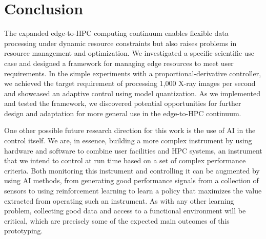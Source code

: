 \section{Conclusion}
\label{ch6:sec:conclusion}

The expanded edge-to-HPC computing continuum enables flexible data processing under dynamic resource constraints but also raises  problems in resource management and optimization. We investigated a specific scientific use case and designed a framework for managing edge resources to meet user requirements. In the simple experiments with a proportional-derivative controller, we achieved the target requirement of processing 1,000 X-ray images per second and showcased an adaptive control using model quantization. As we implemented and tested the framework, we discovered potential opportunities for further design and adaptation for more general use in the edge-to-HPC continuum.

One other possible future research direction for this work is the use of AI in the control itself. We are, in essence, building a more complex instrument by using hardware and software to combine user facilities and HPC systems, an instrument that we intend to control at run time based on a set of complex performance criteria. Both monitoring this instrument and controlling it can be augmented by using AI methods, from generating good performance signals from a collection of sensors to using reinforcement learning to learn a policy that maximizes the value extracted from operating such an instrument. As with any other learning problem, collecting good data and access to a functional environment will be critical, which are precisely some of the expected main outcomes of this prototyping.

%



